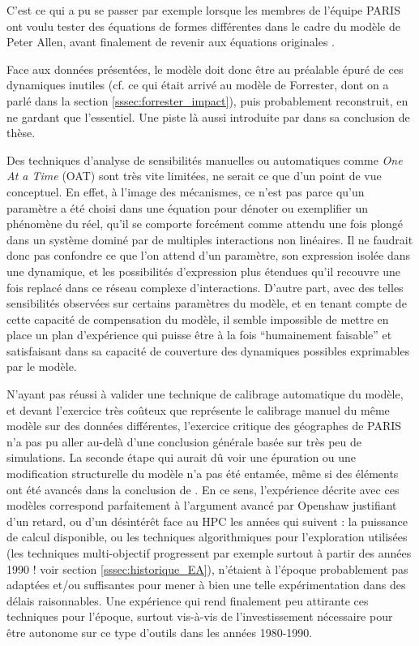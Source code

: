 C'est ce qui a pu se passer par exemple lorsque les membres de l'équipe PARIS ont voulu tester des équations de formes différentes dans le cadre du modèle de Peter Allen, avant finalement de revenir aux équations originales \autocites{Sanders1984}[147]{Pumain1989}.

Face aux données présentées, le modèle doit donc être au préalable épuré de ces dynamiques inutiles (cf. ce qui était arrivé au modèle de Forrester, dont on a parlé dans la section \ref{sssec:forrester_impact}), puis probablement reconstruit, en ne gardant que l'essentiel. Une piste là aussi introduite par \textcite{Sanders1984} dans sa conclusion de thèse.

Des techniques d'analyse de sensibilités manuelles ou automatiques comme \textit{One At a Time} (OAT) sont très vite limitées, ne serait ce que d'un point de vue conceptuel. En effet, à l'image des mécanismes, ce n'est pas parce qu'un paramètre a été choisi dans une équation pour dénoter ou exemplifier un phénomène du réel, qu'il se comporte forcément comme attendu une fois plongé dans un système dominé par de multiples interactions non linéaires. Il ne faudrait donc pas confondre ce que l'on attend d'un paramètre, son expression isolée dans une dynamique, et les possibilités d'expression plus étendues qu'il recouvre une fois replacé dans ce réseau complexe d'interactions. D'autre part, avec des telles sensibilités observées sur certains paramètres du modèle, et en tenant compte de cette capacité de compensation du modèle, il semble impossible de mettre en place un plan d'expérience qui puisse être à la fois \enquote{humainement faisable} et satisfaisant dans sa capacité de couverture des dynamiques possibles exprimables par le modèle.

N'ayant pas réussi à valider une technique de calibrage automatique du modèle, et devant l'exercice très coûteux que représente le calibrage manuel du même modèle sur des données différentes, l'exercice critique des géographes de PARIS n'a pas pu aller au-delà d'une conclusion générale basée sur très peu de simulations. La seconde étape qui aurait dû voir une épuration ou une modification structurelle du modèle n'a pas été entamée, même si des éléments ont été avancés dans la conclusion de \textcite{Sanders1984}. En ce sens, l'expérience décrite avec ces modèles correspond parfaitement à l'argument avancé par Openshaw justifiant d'un retard, ou d'un désintérêt face au HPC les années qui suivent : la puissance de calcul disponible, ou les techniques algorithmiques pour l'exploration utilisées (les techniques multi-objectif progressent par exemple surtout à partir des années 1990 ! voir section \ref{sssec:historique_EA}), n'étaient à l'époque probablement pas adaptées et/ou suffisantes pour mener à bien une telle expérimentation dans des délais raisonnables. Une expérience qui rend finalement peu attirante ces techniques pour l'époque, surtout vis-à-vis de l'investissement nécessaire pour être autonome sur ce type d'outils dans les années 1980-1990.

